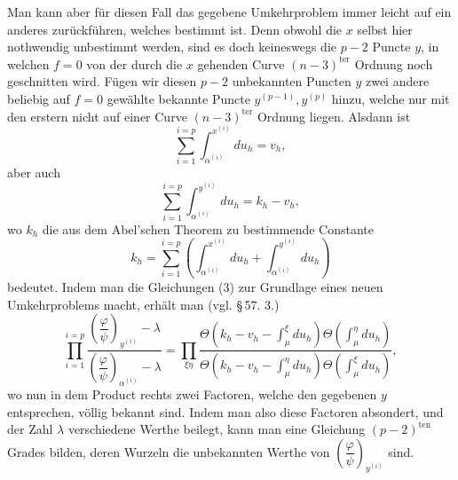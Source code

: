 \documentclass[10pt]{article}
\begin{document}
Man kann aber für diesen Fall das gegebene Umkehrproblem immer leicht auf ein anderes zurückführen, welches bestimmt ist. Denn obwohl die \(x\) selbst hier nothwendig unbestimmt werden, sind es doch keineswegs die \(p-2\) Puncte \(y\), in welchen \(f=0\) von der durch die \(x\) gehenden Curve \((n-3)^{\mathrm{ter}}\) Ordnung noch geschnitten wird. Fügen wir diesen \(p-2\) unbekannten Puncten \(y\) zwei andere beliebig auf \(f=0\) gewählte bekannte Puncte \(y^{(p-1)},y^{(p)}\) hinzu, welche nur mit den erstern nicht auf einer Curve \((n-3)^{\mathrm{ter}}\) Ordnung liegen. Alsdann ist
\[
\sum_{i=1}^{i=p}\int_{\alpha^{(i)}}^{x^{(i)}}du_h=v_h,
\]
aber auch
\[
\tag{3}
\sum_{i=1}^{i=p}\int_{\alpha^{(i)}}^{y^{(i)}}du_h=k_h-v_h,
\]
wo \(k_h\) die aus dem Abel'schen Theorem zu bestimmende Constante
\[
k_h=\sum_{i=1}^{i=p}\left(\int_{\alpha^{(i)}}^{x^{(i)}}du_h+
\int_{\alpha^{(i)}}^{y^{(i)}}du_h\right)
\]
bedeutet. Indem man die Gleichungen (3) zur Grundlage eines neuen Umkehrproblems macht, erhält man (vgl. \S\,57. 3.)
\[
\prod_{i=1}^{i=p}
\frac{\left(\dfrac{\varphi}{\psi}\right)_{y^{(i)}}-\lambda}
     {\left(\dfrac{\varphi}{\psi}\right)_{\alpha^{(i)}}-\lambda}
=
\prod_{\xi\eta}
\frac{\Theta\left(k_h-v_h-\int_{\mu}^{\xi}du_h\right)\Theta\left(\int_{\mu}^{\eta}du_h\right)}
     {\Theta\left(k_h-v_h-\int_{\mu}^{\eta}du_h\right)\Theta\left(\int_{\mu}^{\xi}du_h\right)},
\]
wo nun in dem Product rechts zwei Factoren, welche den gegebenen \(y\) entsprechen, völlig bekannt sind. Indem man also diese Factoren absondert, und der Zahl \(\lambda\) verschiedene Werthe beilegt, kann man eine Gleichung \((p-2)^{\mathrm{ten}}\) Grades bilden, deren Wurzeln die unbekannten Werthe von \(\left(\dfrac{\varphi}{\psi}\right)_{y^{(i)}}\) sind.
\end{document}

